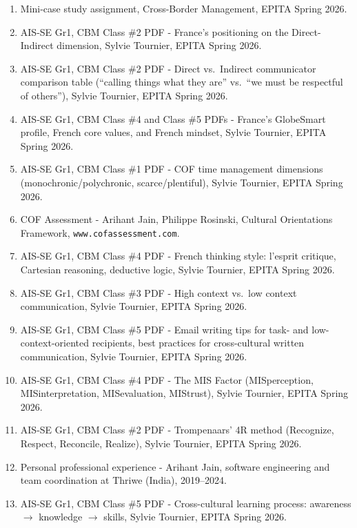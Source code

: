 \documentclass[12pt, a4paper]{article}
\begin{document}
\begin{enumerate}[noitemsep]
    \item Mini-case study assignment, Cross-Border Management, EPITA Spring 2026.
    \item AIS-SE Gr1, CBM Class \#2 PDF  -  France's positioning on the Direct-Indirect dimension, Sylvie Tournier, EPITA Spring 2026.
    \item AIS-SE Gr1, CBM Class \#2 PDF  -  Direct vs.\ Indirect communicator comparison table (``calling things what they are'' vs.\ ``we must be respectful of others''), Sylvie Tournier, EPITA Spring 2026.
    \item AIS-SE Gr1, CBM Class \#4 and Class \#5 PDFs  -  France's GlobeSmart profile, French core values, and French mindset, Sylvie Tournier, EPITA Spring 2026.
    \item AIS-SE Gr1, CBM Class \#1 PDF  -  COF time management dimensions (monochronic/polychronic, scarce/plentiful), Sylvie Tournier, EPITA Spring 2026.
    \item COF Assessment  -  Arihant Jain, Philippe Rosinski, Cultural Orientations Framework, \texttt{www.cofassessment.com}.
    \item AIS-SE Gr1, CBM Class \#4 PDF  -  French thinking style: l'esprit critique, Cartesian reasoning, deductive logic, Sylvie Tournier, EPITA Spring 2026.
    \item AIS-SE Gr1, CBM Class \#3 PDF  -  High context vs.\ low context communication, Sylvie Tournier, EPITA Spring 2026.
    \item AIS-SE Gr1, CBM Class \#5 PDF  -  Email writing tips for task- and low-context-oriented recipients, best practices for cross-cultural written communication, Sylvie Tournier, EPITA Spring 2026.
    \item AIS-SE Gr1, CBM Class \#4 PDF  -  The MIS Factor (MISperception, MISinterpretation, MISevaluation, MIStrust), Sylvie Tournier, EPITA Spring 2026.
    \item AIS-SE Gr1, CBM Class \#2 PDF  -  Trompenaars' 4R method (Recognize, Respect, Reconcile, Realize), Sylvie Tournier, EPITA Spring 2026.
    \item Personal professional experience  -  Arihant Jain, software engineering and team coordination at Thriwe (India), 2019--2024.
    \item AIS-SE Gr1, CBM Class \#5 PDF  -  Cross-cultural learning process: awareness $\rightarrow$ knowledge $\rightarrow$ skills, Sylvie Tournier, EPITA Spring 2026.
\end{enumerate}
\end{document}
